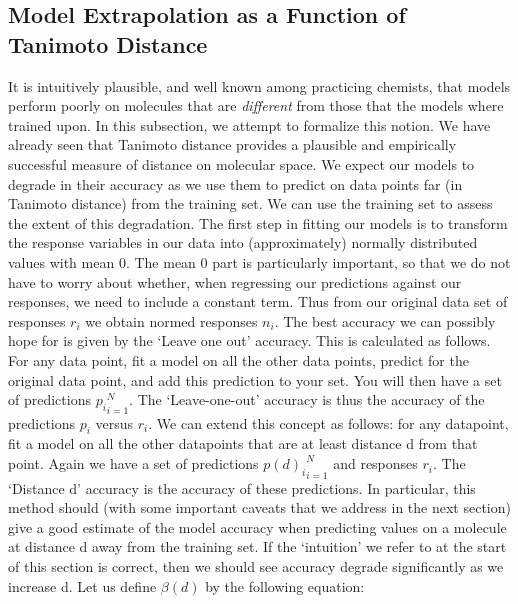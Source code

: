 \documentclass[journal=jacsat,manuscript=article]{achemso}
\begin{document}
\subsection*{Model Extrapolation as a Function of Tanimoto Distance}
It is intuitively plausible, and well known among practicing chemists, that models perform poorly on molecules that are \textit{different} from those that the models where trained upon\cite{et0:}.  In this subsection, we attempt to formalize this notion.  We have already seen that Tanimoto distance provides a plausible and empirically successful measure of distance on molecular space.
\newline
\newline
We expect our models to degrade in their accuracy as we use them to predict on data points far (in Tanimoto distance) from the training set. We can use the training set to assess the extent of this degradation.
\newline
\newline
The first step in fitting our models is to transform the response variables in our data into (approximately) normally distributed values with mean 0. The mean 0 part is particularly important, so that we do not have to worry about whether, when regressing our predictions against our responses, we need to include a constant term.  Thus from our original data set of responses $r_i$ we obtain normed responses $n_i$.
\newline
\newline
The best accuracy we can possibly hope for is given by the `Leave one out' accuracy.  This is calculated as follows.  For any data point, fit a model on all the other data points, predict for the original data point, and add this prediction to your set.  You will then have a set of predictions ${ p_i }_{i = 1}^N$. The `Leave-one-out' accuracy is thus the accuracy of the predictions $p_i$ versus $r_i$.
\newline
\newline
We can extend this concept as follows:  for any datapoint, fit a model on all the other datapoints that are at least distance d from that point.  Again we have a set of predictions ${ p(d)_i }_{i = 1}^N$ and responses $r_i$.  The `Distance d' accuracy is the accuracy of these predictions.  In particular, this method should (with some important caveats that we address in the next section) give a good estimate of the model accuracy when predicting values on a molecule at distance d away from the training set.  If the `intuition' we refer to at the start of this section is correct, then we should see accuracy degrade significantly as we increase d.
\newline
\newline
Let us define $\beta(d)$ by the following equation:
\end{document}
